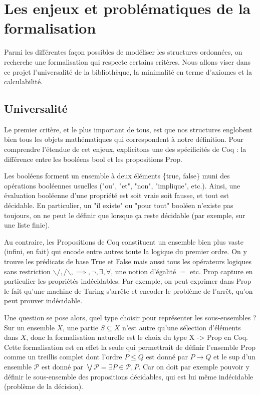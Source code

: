 \documentclass{article}
\newcommand\code[1]{{\fontfamily{lmtt}\selectfont #1}}
\theoremstyle{definition}
\begin{document}

\section{Les enjeux et problématiques de la formalisation}

Parmi les différentes façon possibles de modéliser les structures ordonnées, on recherche une formalisation qui respecte certains critères. Nous allons viser dans ce projet l'universalité de la bibliothèque, la minimalité en terme d'axiomes et la calculabilité.

\subsection{Universalité}
\label{universalite}

Le premier critère, et le plus important de tous, est que nos structures englobent bien tous les objets mathématiques qui correspondent à notre définition. Pour comprendre l'étendue de cet enjeux, explicitons une des spécificités de Coq : la différence entre les booléens \code{bool} et les propositions \code{Prop}.

Les booléens forment un ensemble à deux éléments \{\code{true}, \code{false}\} muni des opérations booléennes usuelles ("ou", "et", "non", "implique", etc.). Ainsi, une évaluation booléenne d'une propriété est soit vraie soit fausse, et tout est décidable. En particulier, un "il existe" ou "pour tout" booléen n'existe pas toujours, on ne peut le définir que lorsque ça reste décidable (par exemple, sur une liste finie).

Au contraire, les Propositions de Coq constituent un ensemble bien plus vaste (infini, en fait) qui encode entre autres toute la logique du premier ordre. On y trouve les prédicats de base \code{True} et \code{False} mais aussi tous les opérateurs logiques sans restriction $\backslash/, /\backslash, \implies, \neg, \exists, \forall$, une notion d'égalité $=$ etc. \code{Prop} capture en particulier les propriétés indécidables. Par exemple, on peut exprimer dans \code{Prop} le fait qu'une machine de Turing s'arrête et encoder le problème de l'arrêt, qu'on peut prouver indécidable.

\medskip

Une question se pose alors, quel type choisir pour représenter les sous-ensembles ? Sur un ensemble $X$, une partie $S \subseteq X$ n'est autre qu'une sélection d'éléments dans $X$, donc la formalisation naturelle est le choix du type \code{X -> Prop} en Coq. Cette formalisation est en effet la seule qui permettrait de définir l'ensemble \code{Prop} comme un treillis complet dont l'ordre $P \leq Q$ est donné par $P \rightarrow Q$ et le sup d'un ensemble $\mathcal{P}$ est donné par $\bigvee \mathcal{P} = \exists P \in \mathcal{P}, P$. Car on doit par exemple pouvoir y définir le sous-ensemble des propositions décidables, qui est lui même indécidable (problème de la décision).
\end{document}
